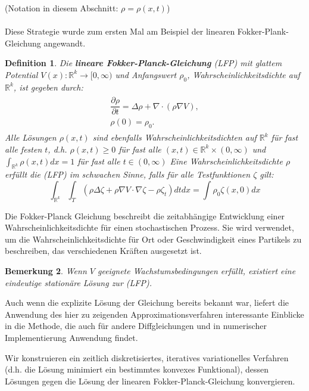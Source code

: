 \documentclass[11pt,a4paper,notitlepage]{scrreprt}
\newcommand{\RR}{\mathbb{R}}
\newtheorem{defi}{Definition}[section]
\newtheorem{bem}[defi]{Bemerkung}
\begin{document}
(Notation in diesem Abschnitt: $\rho=\rho(x,t)$)\\\\
Diese Strategie wurde zum ersten Mal am Beispiel der linearen Fokker-Plank-Gleichung angewandt. \\
\begin{defi}
Die \textbf{lineare Fokker-Planck-Gleichung} (LFP) mit glattem Potential $V(x):\RR^k\to[0,\infty)$ und Anfangswert $\rho_0$, Wahrscheinlichkeitsdichte auf $\RR^k$, ist gegeben durch:
\begin{eqnarray}
\begin{split}
\dfrac{\partial\rho}{\partial t}=\Delta\rho+\nabla\cdot(\rho\nabla V),\\
\rho(0)=\rho_0.\label{FP}
\end{split}
\end{eqnarray}
Alle Lösungen $\rho(x,t)$ sind ebenfalls Wahrscheinlichkeitsdichten auf $\RR^k$ für fast alle festen $t$, d.h. $\rho(x,t)\geq 0$ für fast alle $(x,t)\in \RR^k\times(0,\infty)$  und $\int_{\RR^k}\rho(x,t)dx=1$ für fast alle $t\in(0,\infty)$
Eine Wahrscheinlichkeitsdichte $\rho$ erfüllt die (LFP) im schwachen Sinne, falls für alle Testfunktionen $\zeta$ gilt:
\begin{equation}
\int_{\RR^k} \int_T (\rho\Delta\zeta+\rho\nabla V\cdot\nabla\zeta -\rho\zeta_t) dt dx=\int\rho_0\zeta(x,0)dx \label{FPweak}
\end{equation}
\end{defi}

Die Fokker-Planck Gleichung beschreibt die zeitabhängige Entwicklung einer Wahrscheinlichkeitsdichte für einen stochastischen Prozess. Sie wird verwendet, um die Wahrscheinlichkeitsdichte für Ort oder Geschwindigkeit eines Partikels zu beschreiben, das verschiedenen Kräften ausgesetzt ist.

\begin{bem}
Wenn $V$ geeignete Wachstumsbedingungen erfüllt, existiert eine eindeutige stationäre Lösung zur (LFP).
\end{bem}
Auch wenn die explizite Lösung der Gleichung bereits bekannt war, liefert die Anwendung des hier zu zeigenden Approximationsverfahren interessante Einblicke in die Methode, die auch für andere Diffgleichungen und in numerischer Implementierung Anwendung findet. 


Wir konstruieren ein zeitlich diskretisiertes, iteratives variationelles Verfahren (d.h. die Lösung minimiert ein bestimmtes konvexes Funktional), dessen Lösungen gegen die Lösung der linearen Fokker-Planck-Gleichung konvergieren.
\end{document}
